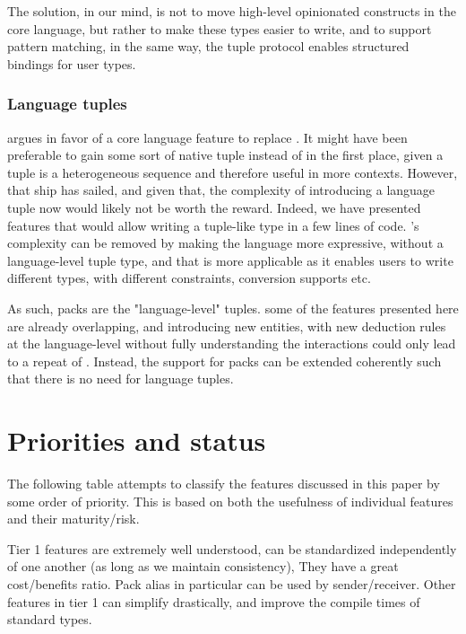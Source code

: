 \documentclass{wg21}
\begin{document}
The solution, in our mind, is not to move high-level opinionated constructs in the core language, but rather to make these types easier to write,
and to support pattern matching, in the same way, the tuple protocol enables structured bindings for user types.

\subsubsection{Language tuples}

 argues in favor of a core language feature to replace .
It might have been preferable to gain some sort of native tuple instead of  in the first place, given a tuple is a heterogeneous sequence and therefore useful in more contexts.
However, that ship has sailed, and given that, the complexity of introducing a language tuple now would likely not be worth the reward.
Indeed, we have presented features that would allow writing a tuple-like type in a few lines of code. 's complexity can be removed by making the language more expressive, without a language-level tuple type, and that is more applicable as it enables users to write different  types, with different constraints,
conversion supports etc.

As such, packs are the "language-level" tuples. some of the features presented here are already overlapping, and introducing new entities, with new deduction rules at the language-level without fully understanding the interactions could only
lead to a repeat of . Instead, the support for packs can be extended coherently such that there is no need for language tuples.


\section{Priorities and status}

The following table attempts to classify the features discussed in this paper by some order of priority.
This is based on both the usefulness of individual features and their maturity/risk.

Tier 1 features are extremely well understood, can be standardized independently of one another (as long as we maintain consistency),
They have a great cost/benefits ratio.
Pack alias in particular can be used by sender/receiver.
Other features in tier 1 can simplify drastically, and improve the compile times of standard types.
\end{document}
